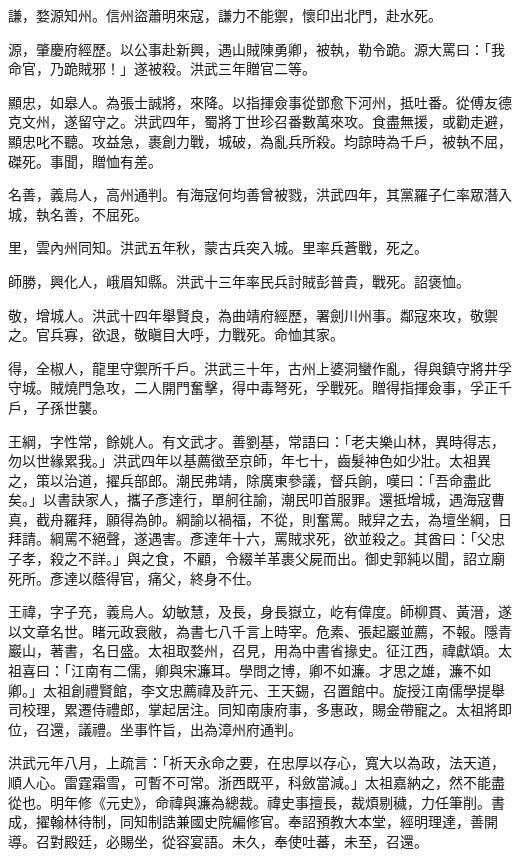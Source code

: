 \begin{pinyinscope}
謙，婺源知州。信州盜蕭明來寇，謙力不能禦，懷印出北門，赴水死。

源，肇慶府經歷。以公事赴新興，遇山賊陳勇卿，被執，勒令跪。源大罵曰：「我命官，乃跪賊邪！」遂被殺。洪武三年贈官二等。

顯忠，如皋人。為張士誠將，來降。以指揮僉事從鄧愈下河州，抵吐番。從傅友德克文州，遂留守之。洪武四年，蜀將丁世珍召番數萬來攻。食盡無援，或勸走避，顯忠叱不聽。攻益急，裹創力戰，城破，為亂兵所殺。均諒時為千戶，被執不屈，磔死。事聞，贈恤有差。

名善，義烏人，高州通判。有海寇何均善曾被戮，洪武四年，其黨羅子仁率眾潛入城，執名善，不屈死。

里，雲內州同知。洪武五年秋，蒙古兵突入城。里率兵蒼戰，死之。

師勝，興化人，峨眉知縣。洪武十三年率民兵討賊彭普貴，戰死。詔褒恤。

敬，增城人。洪武十四年舉賢良，為曲靖府經歷，署劍川州事。鄰寇來攻，敬禦之。官兵寡，欲退，敬瞋目大呼，力戰死。命恤其家。

得，全椒人，龍里守禦所千戶。洪武三十年，古州上婆洞蠻作亂，得與鎮守將井孚守城。賊燒門急攻，二人開門奮擊，得中毒弩死，孚戰死。贈得指揮僉事，孚正千戶，子孫世襲。

王綱，字性常，餘姚人。有文武才。善劉基，常語曰：「老夫樂山林，異時得志，勿以世緣累我。」洪武四年以基薦徵至京師，年七十，齒髮神色如少壯。太祖異之，策以治道，擢兵部郎。潮民弗靖，除廣東參議，督兵餉，嘆曰：「吾命盡此矣。」以書訣家人，攜子彥達行，單舸往諭，潮民叩首服罪。還抵增城，遇海寇曹真，截舟羅拜，願得為帥。綱諭以禍福，不從，則奮罵。賊舁之去，為壇坐綱，日拜請。綱罵不絕聲，遂遇害。彥達年十六，罵賊求死，欲並殺之。其酋曰：「父忠子孝，殺之不詳。」與之食，不顧，令綴羊革裹父屍而出。御史郭純以聞，詔立廟死所。彥達以蔭得官，痛父，終身不仕。

王禕，字子充，義烏人。幼敏慧，及長，身長嶽立，屹有偉度。師柳貫、黃溍，遂以文章名世。睹元政衰敝，為書七八千言上時宰。危素、張起巖並薦，不報。隱青巖山，著書，名日盛。太祖取婺州，召見，用為中書省掾史。征江西，禕獻頌。太祖喜曰：「江南有二儒，卿與宋濂耳。學問之博，卿不如濂。才思之雄，濂不如卿。」太祖創禮賢館，李文忠薦禕及許元、王天錫，召置館中。旋授江南儒學提舉司校理，累遷侍禮郎，掌起居注。同知南康府事，多惠政，賜金帶寵之。太祖將即位，召還，議禮。坐事忤旨，出為漳州府通判。

洪武元年八月，上疏言：「祈天永命之要，在忠厚以存心，寬大以為政，法天道，順人心。雷霆霜雪，可暫不可常。浙西既平，科斂當減。」太祖嘉納之，然不能盡從也。明年修《元史》，命禕與濂為總裁。禕史事擅長，裁煩剔穢，力任筆削。書成，擢翰林待制，同知制誥兼國史院編修官。奉詔預教大本堂，經明理達，善開導。召對殿廷，必賜坐，從容宴語。未久，奉使吐蕃，未至，召還。


\end{pinyinscope}
